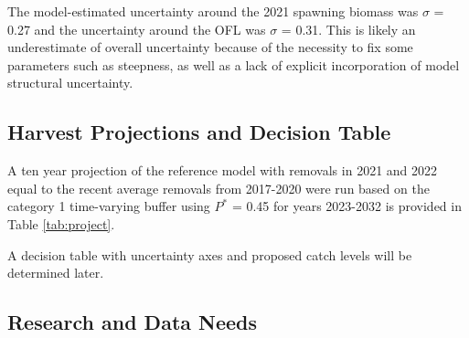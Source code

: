 \documentclass[11pt,
  english,
  a4paper,
]{article}
\begin{document}
\leavevmode\tagmcend\tagstructend


The model-estimated uncertainty around the 2021 spawning biomass was {\(\sigma\)\leavevmode\tagmcend\tagstructend} = 0.27 and the uncertainty around the OFL was {\(\sigma\)\leavevmode\tagmcend\tagstructend} = 0.31. This is likely an underestimate of overall uncertainty because of the necessity to fix some parameters such as steepness, as well as a lack of explicit incorporation of model structural uncertainty.

\leavevmode\tagmcend\tagstructend\par


\hypertarget{harvest-projections-and-decision-table}{%
\subsection*{Harvest Projections and Decision Table}\label{harvest-projections-and-decision-table}}

\leavevmode\tagmcend\tagstructend


A ten year projection of the reference model with removals in 2021 and 2022 equal to the recent average removals from 2017-2020 were run based on the category 1 time-varying buffer using {\(P^*\)\leavevmode\tagmcend\tagstructend} = 0.45 for years 2023-2032 is provided in Table \ref{tab:project}.

\leavevmode\tagmcend\tagstructend\par




A decision table with uncertainty axes and proposed catch levels will be determined later.

\leavevmode\tagmcend\tagstructend\par


\hypertarget{research-and-data-needs}{%
\subsection*{Research and Data Needs}\label{research-and-data-needs}}
\end{document}
